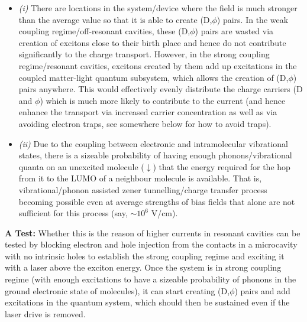 \documentclass[a4paper,twocolumn]{revtex4-1} %
\newcommand{\da}{\downarrow}
\begin{document}
 \begin{itemize}
 
 \item {\it(i)} 
 There are locations in the system/device 
 where the field is much stronger than the average value so that it is able to create (D,$\phi$) 
 pairs.
In the weak coupling regime/off-resonant cavities,
these (D,$\phi$) pairs are wasted via creation of excitons
close to their birth place and hence do not contribute significantly to the charge transport.
However, in the strong coupling regime/resonant cavities,
excitons created by them add up excitations in the coupled 
matter-light quantum subsystem, which allows the creation
of (D,$\phi$) pairs anywhere.
This would effectively evenly distribute the charge carriers (D and $\phi$) which is much more likely to contribute to the current (and hence enhance the transport via increased carrier concentration as well as via avoiding electron traps, see somewhere below for how to avoid traps).
 
\item {\it(ii)} 
Due to the coupling between electronic and intramolecular 
 vibrational states, there is a sizeable probability of having enough 
 phonons/vibrational quanta 
 on an unexcited molecule ($\da$)
 that %
 the energy required for the hop from it to the LUMO of a neighbour molecule is available. That is, vibrational/phonon assisted zener tunnelling/charge transfer process becoming possible even at average strengths of bias fields that alone are not sufficient for this process (say, $\sim10^6$ V/cm). 

\end{itemize}

{\bf A Test: }
Whether this is the reason of higher currents in resonant cavities 
can be tested by blocking electron and hole injection from the 
contacts in a microcavity with no intrinsic holes to establish the 
strong coupling regime and exciting it with a laser above the exciton energy. 
Once the system is in strong coupling regime 
(with enough excitations to have a sizeable probability 
of phonons in the ground electronic state of molecules),
it can start creating (D,$\phi$) pairs and add excitations in the 
quantum system, which should then be sustained even if the laser 
drive is removed.
\end{document}

